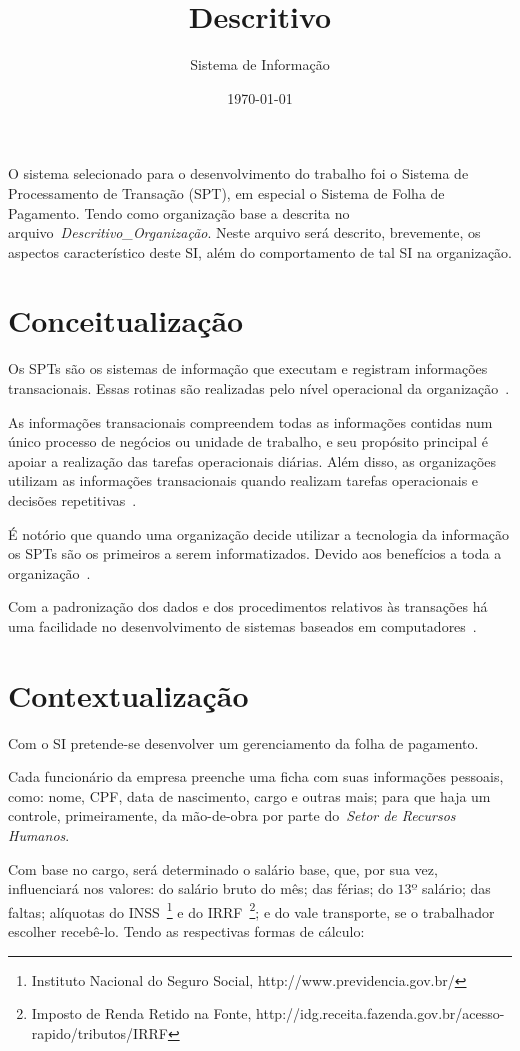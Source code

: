 \documentclass [12pt]{article}
\title {Descritivo}
\subtitle {Sistema de Informação}
\date {\today}
\begin{document}
	\inserirTitulo

	O sistema selecionado para o desenvolvimento do trabalho foi o Sistema de Processamento de Transação (SPT), em especial o Sistema de Folha de Pagamento. Tendo como organização base a descrita no arquivo~\emph{Descritivo\_Organização}. Neste arquivo será descrito, brevemente, os aspectos característico deste SI, além do comportamento de tal SI na organização.
	
	\section{Conceitualização}	
	
	Os SPTs são os sistemas de informação que executam e registram informações transacionais. Essas rotinas são realizadas pelo nível operacional da organização~\cite{Audy:2009}.

	As informações transacionais compreendem todas as informações contidas num único processo de negócios ou unidade de trabalho, e seu propósito principal é apoiar a realização das tarefas operacionais diárias. Além disso, as organizações utilizam as informações transacionais quando realizam tarefas operacionais e decisões repetitivas~\cite{Baltzan:2012}.
	
	É notório que quando uma organização decide utilizar a tecnologia da informação os SPTs são os primeiros a serem informatizados. Devido aos benefícios a toda a organização~\cite{Audy:2009}.
	
	Com a padronização dos dados e dos procedimentos relativos às transações há uma facilidade no desenvolvimento de sistemas baseados em computadores~\cite{Audy:2009}.
	
	\section{Contextualização}
	Com o SI pretende-se desenvolver um gerenciamento da folha de pagamento.
	
	Cada funcionário da empresa preenche uma ficha com suas informações pessoais, como: nome, CPF, data de nascimento, cargo e outras mais; para que haja um controle, primeiramente, da mão-de-obra por parte do~\textit{Setor de Recursos Humanos}.
	
	Com base no cargo, será determinado o salário base, que, por sua vez, influenciará nos valores: do salário bruto do mês; das férias; do $13º$ salário; das faltas; alíquotas do INSS~\footnote{Instituto Nacional do Seguro Social, http://www.previdencia.gov.br/} e do IRRF~\footnote{Imposto de Renda Retido na Fonte, http://idg.receita.fazenda.gov.br/acesso-rapido/tributos/IRRF}; e do vale transporte, se o trabalhador escolher recebê-lo. Tendo as respectivas formas de cálculo:
	
\end{document}
